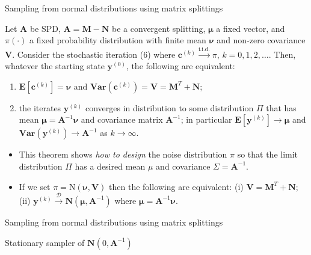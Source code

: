 \documentclass[10pt]{beamer}
\begin{document}
\begin{frame}{Sampling from normal distributions using matrix splittings}
    \begin{theorem} %
        Let $\mathbf{A}$ be SPD, $\mathbf{A} = \mathbf{M} - \mathbf{N}$ be a convergent splitting,
        $\mathbf{\mu}$ a fixed vector, and $\pi(\cdot)$ a fixed probability distribution with finite mean
        $\mathbf{\nu}$ and non-zero covariance $\mathbf{V}$. Consider the stochastic iteration (6) where
        $\mathbf{c}^{(k)} \overset{\text{i.i.d.}}{\to}\pi$, $k = 0, 1, 2, \dots .$ Then, whatever the starting
        state $\mathbf{y}^{(0)}$, the following are equivalent:
        \begin{enumerate}
            \item $\textbf{E}[\mathbf{c}^{(k)}] = \mathbf{\nu}$ and 
            $\textbf{Var}(\mathbf{c}^{(k)}) = \mathbf{V} = \mathbf{M}^T + \mathbf{N}$;
            \item the iterates $\mathbf{y}^{(k)}$ converges in distribution to some distribution $\Pi$ that
            has mean $\mathbf{\mu} = \mathbf{A}^{-1}\mathbf{\nu}$ and covariance matrix $\mathbf{A}^{-1}$;
            in particular $\textbf{E}[\mathbf{y}^{(k)}] \to \mathbf{\mu}$ and 
            $\textbf{Var}(\mathbf{y}^{(k)}) \to \mathbf{A}^{-1}$ as $k \to \infty$.
        \end{enumerate}
    \end{theorem}
    \begin{itemize}
        \item This theorem shows \emph{\color{blue} how to design} the noise distribution $\pi$ 
        so that the limit distribution
        $\Pi$ has a desired mean $\mu$ and covariance $\Sigma = \mathbf{A}^{-1}$.
        \item If we set $\pi = \text{N}(\mathbf{\nu}, \mathbf{V})$ then the following are equivalent:
        (i) $\mathbf{V} = \mathbf{M}^T + \mathbf{N}$; 
        (ii) $\mathbf{y}^{(k)} \overset{\mathcal{D}}{\to} \mathbf{N}(\mathbf{\mu}, \mathbf{A}^{-1})$
        where $\mathbf{\mu} = \mathbf{A}^{-1}\mathbf{\nu}$.
    \end{itemize}
\end{frame}

\begin{frame}{Sampling from normal distributions using matrix splittings}
    \begin{algorithm}[H]
        \caption{Stationary sampler of  $\mathbf{N}(0, \mathbf{A}^{-1})$}
    \end{algorithm}
\end{frame}
\end{document}
